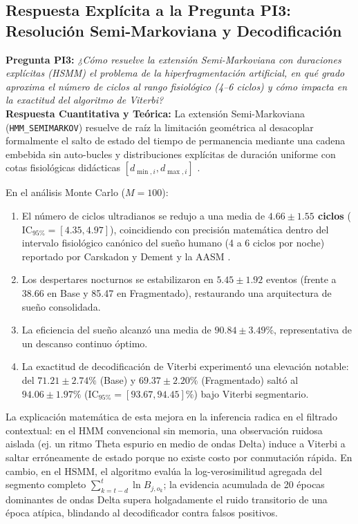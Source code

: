 \documentclass[11pt,a4paper]{article}
\begin{document}
\subsection{Respuesta Explícita a la Pregunta PI3: Resolución Semi-Markoviana y Decodificación}
\noindent\textbf{Pregunta PI3:} \textit{¿Cómo resuelve la extensión Semi-Markoviana con duraciones explícitas (HSMM) el problema de la hiperfragmentación artificial, en qué grado aproxima el número de ciclos al rango fisiológico (4--6 ciclos) y cómo impacta en la exactitud del algoritmo de Viterbi?}\\[0.15cm]
\noindent\textbf{Respuesta Cuantitativa y Teórica:} La extensión Semi-Markoviana (\texttt{HMM\_SEMIMARKOV}) resuelve de raíz la limitación geométrica al desacoplar formalmente el salto de estado del tiempo de permanencia mediante una cadena embebida sin auto-bucles y distribuciones explícitas de duración uniforme con cotas fisiológicas didácticas $[d_{\min, i}, d_{\max, i}]$ \cite{ferguson1980, yu2010}.

En el análisis Monte Carlo ($M=100$):
\begin{enumerate}[leftmargin=*,itemsep=1pt]
    \item El número de ciclos ultradianos se redujo a una media de \textbf{$4.66 \pm 1.55$ ciclos} ($\mathrm{IC}_{95\%} = [4.35, 4.97]$), coincidiendo con precisión matemática dentro del intervalo fisiológico canónico del sueño humano (4 a 6 ciclos por noche) reportado por Carskadon y Dement \cite{carska2011} y la AASM \cite{aasm2020}.
    \item Los despertares nocturnos se estabilizaron en $5.45 \pm 1.92$ eventos (frente a 38.66 en Base y 85.47 en Fragmentado), restaurando una arquitectura de sueño consolidada.
    \item La eficiencia del sueño alcanzó una media de $90.84 \pm 3.49\%$, representativa de un descanso continuo óptimo.
    \item La exactitud de decodificación de Viterbi experimentó una elevación notable: del $71.21 \pm 2.74\%$ (Base) y $69.37 \pm 2.20\%$ (Fragmentado) saltó al \textbf{$94.06 \pm 1.97\%$} ($\mathrm{IC}_{95\%} = [93.67, 94.45]\%$) bajo Viterbi segmentario.
\end{enumerate}

La explicación matemática de esta mejora en la inferencia radica en el filtrado contextual: en el HMM convencional sin memoria, una observación ruidosa aislada (ej. un ritmo Theta espurio en medio de ondas Delta) induce a Viterbi a saltar erróneamente de estado porque no existe costo por conmutación rápida. En cambio, en el HSMM, el algoritmo evalúa la log-verosimilitud agregada del segmento completo $\sum_{k=t-d}^t \ln B_{j, o_k}$; la evidencia acumulada de 20 épocas dominantes de ondas Delta supera holgadamente el ruido transitorio de una época atípica, blindando al decodificador contra falsos positivos.
\end{document}
